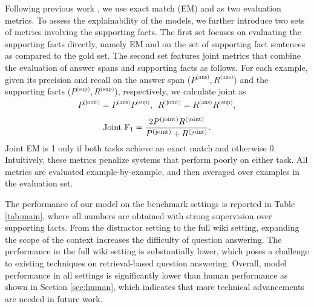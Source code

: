 
Following previous work \cite{rajpurkar2016squad}, we use exact match (EM) and \fone{} as two evaluation metrics.
To assess the explainability of the models, we further introduce two sets of metrics involving the supporting facts.
The first set focuses on evaluating the supporting facts directly, namely EM and \fone{} on the set of supporting fact sentences as compared to the gold set.
The second set features joint metrics that combine the evaluation of answer spans and supporting facts as follows.
For each example, given its precision and recall on the answer span ($P^{\text{(ans)}}, R^{\text{(ans)}}$) and the supporting facts ($P^{\text{(sup)}}, R^{\text{(sup)}}$), respectively, we calculate joint \fone{} as
\begin{align*}
P^{\text{(joint)}} = P^{\text{(ans)}}P^{\text{(sup)}}, ~~R^{\text{(joint)}} = R^{\text{(ans)}}R^{\text{(sup)}},
\end{align*}
\vspace{-2em}
\begin{align*}
\text{Joint F\textsubscript{1}} = \frac{2 P^{\text{(joint)}} R^{\text{(joint)}}}{P^{\text{(joint)}} + R^{\text{(joint)}}}.
\end{align*}
Joint EM is 1 only if both tasks achieve an exact match and otherwise 0.
Intuitively, these metrics penalize systems that perform poorly on either task.
All metrics are evaluated example-by-example, and then averaged over examples in the evaluation set.

The performance of our model on the benchmark settings is reported in Table \ref{tab:main}, where all numbers are obtained with strong supervision over supporting facts. From the distractor setting to the full wiki setting, expanding the scope of the context increases the difficulty of question answering.
The performance in the full wiki setting is substantially lower, which poses a challenge to existing techniques on retrieval-based question answering.
Overall, model performance in all settings is significantly lower than human performance as shown in Section \ref{sec:human}, which indicates that more technical advancements are needed in future work.


